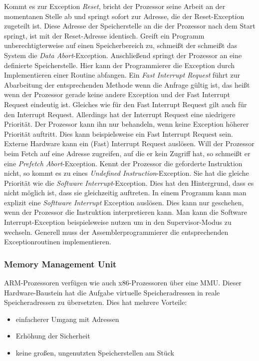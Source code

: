 Kommt es zur Exception \textit{Reset}, bricht der Prozessor seine Arbeit an der momentanen Stelle ab und springt sofort zur Adresse, die der Reset-Exception zugeteilt ist. Diese Adresse der Speicherstelle an die der Prozessor nach dem Start springt, ist mit der Reset-Adresse identisch. 
Greift ein Programm unberechtigterweise auf einen Speicherbereich zu, schmeißt der schmeißt das System die \textit{Data Abort}-Exception. Anschließend springt der Prozessor an eine definierte Speicherstelle. Hier kann der Programmierer die Exception durch Implementieren einer Routine abfangen. Ein \textit{Fast Interrupt Request} führt zur Abarbeitung der entsprechenden Methode wenn die Anfrage gültig ist, das heißt wenn der Prozessor gerade keine andere Exception und der Fast Interrupt Request eindeutig ist. Gleiches wie für den Fast Interrupt Request gilt auch für den Interrupt Request. Allerdings hat der Interrupt Request eine niedrigere Priorität. Der Prozessor kann ihn nur behandeln, wenn keine Exception höherer Priorität auftritt. Dies kann beispielsweise ein Fast Interrupt Request sein. Externe Hardware kann ein (Fast) Interrupt Request auslösen. 
Will der Prozessor beim Fetch auf eine Adresse zugreifen, auf die er kein Zugriff hat, so schmeißt er eine \textit{Prefetch Abort}-Exception. Kennt der Prozessor die geforderte Instruktion nicht, so kommt es zu eines \textit{Undefined Instruction}-Exception. Sie hat die gleiche Priorität wie die \textit{Software Interrupt}-Exception. Dies hat den Hintergrund, dass es nicht möglich ist, dass sie gleichzeitig auftreten. In einem Programm kann man explizit eine \textit{Softtware Interrupt} Exception auslösen. Dies kann nur geschehen, wenn der Prozessor die Instruktion interpretieren kann. Man kann die Software Interrupt-Exception beispielsweise nutzen um in den Supervisor-Modus zu wechseln.
Generell muss der Assemblerprogrammierer die entsprechenden Exceptionroutinen implementieren. 


\cite{arm2009}

\subsubsection{Memory Management Unit}
ARM-Prozessoren verfügen wie auch x86-Prozessoren über eine \ac{MMU}. Dieser Hardware-Baustein hat die Aufgabe virtuelle Speicheradressen in reale Speicheradressen zu übersetzten. Dies hat mehrere Vorteile: 
\begin{itemize}
\item einfacherer Umgang mit Adressen
\item Erhöhung der Sicherheit 
\item keine großen, ungenutzten Speicherstellen am Stück 
\end{itemize}

